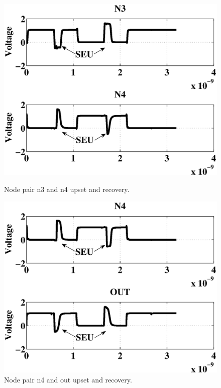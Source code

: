 \begin{figure}[!htbp]
\centering
\parbox{4cm}{
\includegraphics[width=\linewidth]{Figures/WavePlots/n3n4.eps}
\caption{Node pair n3 and n4 upset and recovery.}
\label{fig:n3n4}}
\qquad
\begin{minipage}{4cm}
\includegraphics[width=\linewidth]{Figures/WavePlots/n4out.eps}
\caption{Node pair n4 and out upset and recovery.}
\label{fig:n4out}
\end{minipage}
\end{figure}

